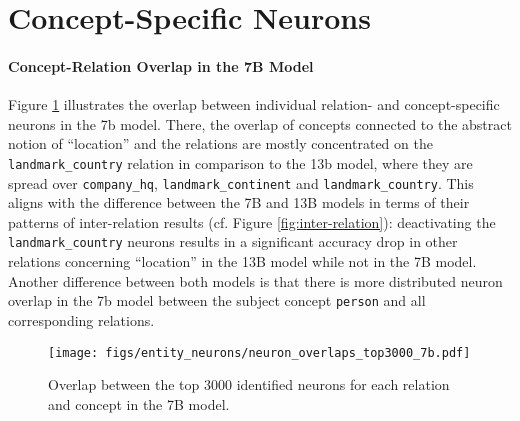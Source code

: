 \section{Concept-Specific Neurons}
\paragraph{Concept-Relation Overlap in the 7B Model}
Figure \ref{fig:concept_neuron_overlap} illustrates the overlap between individual relation- and concept-specific neurons in the 7b model. 
There, the overlap of concepts connected to the abstract notion of ``location'' and the relations are mostly concentrated on the \texttt{landmark\_country} relation in comparison to the 13b model, where they are spread over \texttt{company\_hq}, \texttt{landmark\_continent} and \texttt{landmark\_country}. 
This aligns with the difference between the 7B and 13B models in terms of their patterns of inter-relation results (cf. Figure \ref{fig:inter-relation}): deactivating the \texttt{landmark\_country} neurons results in a significant accuracy drop in other relations concerning ``location'' in the 13B model while not in the 7B model.
Another difference between both models is that there is more distributed neuron overlap in the 7b model between the subject concept \texttt{person} and all corresponding relations.

\begin{figure}
    \centering
    \setlength{\abovecaptionskip}{-0.1cm}
\texttt{[image: figs/entity\_neurons/neuron\_overlaps\_top3000\_7b.pdf]}
    \caption{Overlap between the top 3000 identified neurons for each relation and concept in the 7B model. }
    \label{fig:concept_neuron_overlap}
\end{figure}


